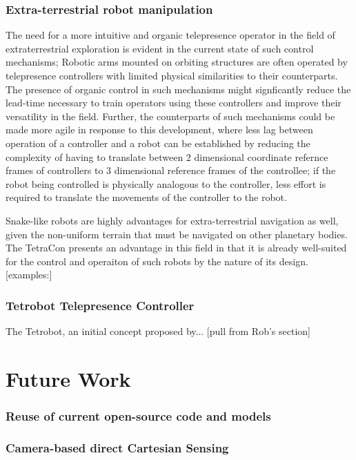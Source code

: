 \documentclass[11pt]{article}
\begin{document}
\subsubsection{Extra-terrestrial robot manipulation}

The need for a more intuitive and organic telepresence operator in the field of extraterrestrial exploration is evident in the current state of such control mechanisms; Robotic arms mounted on orbiting structures are often operated by telepresence controllers with limited physical similarities to their counterparts. The presence of organic control in such mechanisms might signficantly reduce the lead-time necessary to train operators using these controllers and improve their versatility in the field. Further, the counterparts of such mechanisms could be made more agile in response to this development, where less lag between operation of a controller and a robot can be established by reducing the complexity of having to translate between 2 dimensional coordinate refernce frames of controllers to 3 dimensional reference frames of the controllee; if the robot being controlled is physically analogous to the controller, less effort is required to translate the movements of the controller to the robot.

Snake-like robots are highly advantages for extra-terrestrial navigation as well, given the non-uniform terrain that must be navigated on other planetary bodies. The TetraCon presents an advantage in this field in that it is already well-suited for the control and operaiton of such robots by the nature of its design. [examples:]
\subsubsection{Tetrobot Telepresence Controller}

The Tetrobot, an initial concept proposed by... [pull from Rob's section]
\section{Future Work}
\subsubsection{Reuse of current open-source code and models}
\subsubsection{Camera-based direct Cartesian Sensing}
\end{document}
